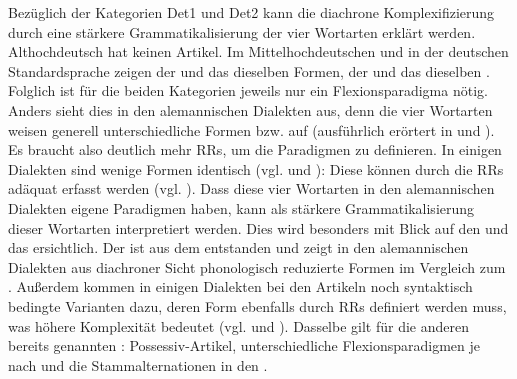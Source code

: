 Bezüglich der Kategorien {Det1 und Det2} kann die diachrone Komplexifizierung durch eine stärkere Grammatikalisierung der vier Wortarten erklärt werden. Althochdeutsch hat keinen Artikel. Im Mittelhochdeutschen und in der deutschen Standardsprache zeigen der  und das  dieselben Formen, der  und das  dieselben . Folglich ist für die beiden Kategorien jeweils nur ein Flexionsparadigma nötig. Anders sieht dies in den alemannischen Dialekten aus, denn die vier Wortarten weisen generell unterschiedliche Formen bzw.  auf (ausführlich erörtert in  und ). Es braucht also deutlich mehr RRs, um die Paradigmen zu definieren. In einigen Dialekten sind wenige Formen identisch (vgl.  und ): Diese  können durch die RRs adäquat erfasst werden (vgl. ). Dass diese vier Wortarten in den alemannischen Dialekten eigene Paradigmen haben, kann als stärkere Grammatikalisierung dieser Wortarten interpretiert werden. Dies wird besonders mit Blick auf den  und das  ersichtlich. Der  ist aus dem  entstanden und zeigt in den alemannischen Dialekten aus diachroner Sicht phonologisch reduzierte Formen im Vergleich zum . Außerdem kommen in einigen Dialekten bei den Artikeln noch syntaktisch bedingte Varianten dazu, deren Form ebenfalls durch RRs definiert werden muss, was höhere Komplexität bedeutet (vgl.  und ). Dasselbe gilt für die anderen bereits genannten : Possessiv-Artikel, unterschiedliche Flexionsparadigmen je nach  und die Stammalternationen in den .

